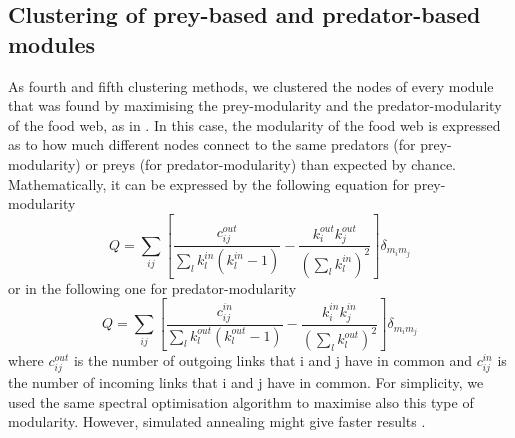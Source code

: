 \documentclass[twocolumn]{article}
\begin{document}
	\subsection*{Clustering of prey-based and predator-based modules}
		As fourth and fifth clustering methods, we clustered the nodes of every module that was found by maximising the prey-modularity and the predator-modularity of the food web, as in \citet{Guimera2010}. In this case, the modularity of the food web is expressed as to how much different nodes connect to the same predators (for prey-modularity) or preys (for predator-modularity) than expected by chance. Mathematically, it can be expressed by the following equation \citep{Guimera2007} for prey-modularity
		\begin{equation}
			Q=\sum_{ij}{\left[\frac{c_{ij}^{out}}{\sum_{l}{k_l^{in}\left(k_l^{in}-1\right)}}-\frac{k_i^{out}k_j^{out}}{\left(\sum_{l} k_l^{in}\right)^2}\right]\delta_{m_im_j}}
		\end{equation}
		or in the following one for predator-modularity
		\begin{equation}
			Q=\sum_{ij}{\left[\frac{c_{ij}^{in}}{\sum_{l}{k_l^{out}\left(k_l^{out}-1\right)}}-\frac{k_i^{in}k_j^{in}}{\left(\sum_{l} k_l^{out}\right)^2}\right]\delta_{m_im_j}}
		\end{equation}
		where $c_{ij}^{out}$ is the number of outgoing links that i and j have in common and $c_{ij}^{in}$ is the number of incoming links that i and j have in common. For simplicity, we used the same spectral optimisation algorithm to maximise also this type of modularity. However, simulated annealing might give faster results \citep{Guimera2007}.
\end{document}
